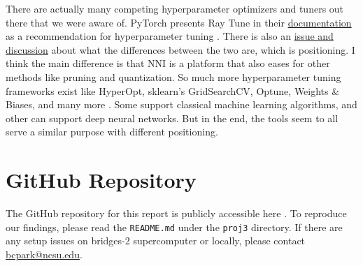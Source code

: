 \documentclass{article}
\begin{document}
There are actually many competing hyperparameter optimizers and tuners out there that we were aware of. PyTorch presents Ray Tune in their \href{https://pytorch.org/tutorials/beginner/hyperparameter_tuning_tutorial.html}{documentation} as a recommendation for hyperparameter tuning \cite{ray-tune}. There is also an \href{https://github.com/microsoft/nni/issues/1743}{issue and discussion} about what the differences between the two are, which is positioning. I think the main difference is that NNI is a platform that also eases for other methods like pruning and quantization. So much more hyperparameter tuning frameworks exist like HyperOpt, sklearn's GridSearchCV, Optune, Weights \& Biases, and many more \cite{optuna}. Some support classical machine learning algorithms, and other can support deep neural networks. But in the end, the tools seem to all serve a similar purpose with different positioning.

\section{GitHub Repository}
The GitHub repository for this report is publicly accessible here \cite{proj3-repo}. To reproduce our findings, please read the \verb|README.md| under the \verb|proj3| directory. If there are any setup issues on bridges-2 supercomputer or locally, please contact \href{mailto:bcpark@ncsu.edu}{bcpark@ncsu.edu}.



\end{document}
